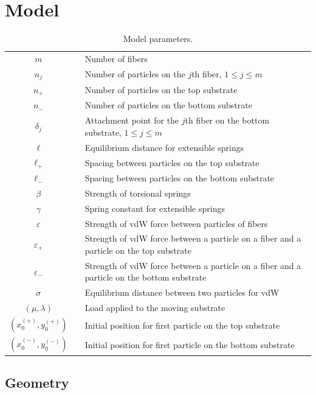 \chapter{Model} \label{chap:two}

\begin{table}[t]
	\centering
	\caption{Model parameters. \label{table:parameters}}
	\begin{tabular}{c p{.25in} p{4.5in}}
		$m$ & & Number of fibers \\
		$n_j$ & & Number of particles on the $j$th fiber, $1 \leq j \leq m$ \\
		$n_+$ & & Number of particles on the top substrate \\
		$n_-$ & & Number of particles on the bottom substrate \\
		$\delta_j$ & & Attachment point for the $j$th fiber on the bottom substrate, $1 \leq j \leq m$ \\
		$\ell$ & & Equilibrium distance for extensible springs \\
		$\ell_+$ & & Spacing between particles on the top substrate \\
		$\ell_-$ & & Spacing between particles on the bottom substrate \\
		$\beta$ & & Strength of torsional springs \\
		$\gamma$ & & Spring constant for extensible springs \\
		$\varepsilon$ & & Strength of vdW force between particles of fibers \\
		$\varepsilon_+$ & & Strength of vdW force between a particle on a fiber and a particle on the top substrate \\
		$\varepsilon_-$ & & Strength of vdW force between a particle on a fiber and a particle on the bottom substrate \\
		$\sigma$ & & Equilibrium distance between two particles for vdW \\
		$(\mu,\lambda)$ & & Load applied to the moving substrate \\
		$(x^{(+)}_0,y^{(+)}_0)$ & & Initial position for first particle on the top substrate \\
		$(x^{(-)}_0,y^{(-)}_0)$ & & Initial position for first particle on the bottom substrate
	\end{tabular}
\end{table}	
	
\section{Geometry}

